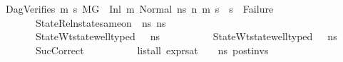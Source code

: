 \begin{isabellebody}
\ \ \ DagVerifies{\isacharcolon}{\kern0pt}{\isachardoublequoteopen}{\isasymforall}\ m{}{\isacharprime}{\kern0pt}\ s{}{\isacharprime}{\kern0pt}{\isachardot}{\kern0pt}\ {\isacharparenleft}{\kern0pt}{\isacharparenleft}{\kern0pt}M{\isacharcomma}{\kern0pt}{\isasymLambda}{\isacharcomma}{\kern0pt}{\isasymGamma}{\isacharcomma}{\kern0pt}{\isasymOmega}{\isacharcomma}{\kern0pt}G\ {\isasymturnstile}\ {\isacharparenleft}{\kern0pt}Inl\ m{\isacharcomma}{\kern0pt}\ Normal\ ns{}{\isacharparenright}{\kern0pt}\ {\isacharminus}{\kern0pt}n{\isasymrightarrow}{\isacharasterisk}{\kern0pt}\ {\isacharparenleft}{\kern0pt}m{}{\isacharprime}{\kern0pt}{\isacharcomma}{\kern0pt}\ s{}{\isacharprime}{\kern0pt}{\isacharparenright}{\kern0pt}{\isacharparenright}{\kern0pt}\ {\isasymlongrightarrow}\ {\isacharparenleft}{\kern0pt}s{}{\isacharprime}{\kern0pt}\ {\isasymnoteq}\ Failure{\isacharparenright}{\kern0pt}{\isacharparenright}{\kern0pt}{\isachardoublequoteclose}\ \isanewline
\ \ \ \ \ \ \ \ \ StateRel{\isacharcolon}{\kern0pt}{\isachardoublequoteopen}nstate{\isacharunderscore}{\kern0pt}same{\isacharunderscore}{\kern0pt}on\ {\isasymLambda}\ ns{}\ ns{}\ {\isacharbraceleft}{\kern0pt}{\isacharbraceright}{\kern0pt}{\isachardoublequoteclose}\ \isanewline
\ \ \ \ \ \ \ \ \ StateWt{\isacharcolon}{\kern0pt}{\isachardoublequoteopen}state{\isacharunderscore}{\kern0pt}well{\isacharunderscore}{\kern0pt}typed\ {\isasymLambda}\ {\isasymOmega}\ ns{}{\isachardoublequoteclose}\ \isanewline
\ \ \ \ \ \ \ \ \ StateWt{}{\isacharcolon}{\kern0pt}{\isachardoublequoteopen}state{\isacharunderscore}{\kern0pt}well{\isacharunderscore}{\kern0pt}typed\ {\isasymLambda}\ {\isasymOmega}\ ns{}{\isachardoublequoteclose}\ \isanewline
\ \ \ \ \ \ \ \ \ SucCorrect{\isacharcolon}{\kern0pt}\isanewline
\ \ \ \ \ \ \ \ \ \ {\isachardoublequoteopen}list{\isacharunderscore}{\kern0pt}all\ {\isacharparenleft}{\kern0pt}expr{\isacharunderscore}{\kern0pt}sat\ {\isasymLambda}\ {\isasymGamma}\ {\isasymOmega}\ ns{}{\isacharparenright}{\kern0pt}\ post{\isacharunderscore}{\kern0pt}invs\ {\isasymLongrightarrow}\ \isanewline

\end{isabellebody}
